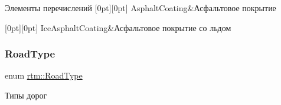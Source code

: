 \begin{DoxyEnumFields}{Элементы перечислений}
[0pt][0pt]{}\mbox{\label{namespacertm_aecd3929e64cd461eb3555b611f6fad95a1f8f9e610f75384989d155de714ce952}} 
Asphalt\+Coating&Асфальтовое покрытие \\
\hline

[0pt][0pt]{}\mbox{\label{namespacertm_aecd3929e64cd461eb3555b611f6fad95a8db92a56dc64708248e1cca508c21fec}} 
Ice\+Asphalt\+Coating&Асфальтовое покрытие со льдом \\
\hline

\end{DoxyEnumFields}
\mbox{\label{namespacertm_abde1dc022a0c505026f6f4da1340cb85}} 
\subsubsection{\texorpdfstring{Road\+Type}{RoadType}}
{\footnotesize\ttfamily enum \hyperlink{namespacertm_abde1dc022a0c505026f6f4da1340cb85}{rtm\+::\+Road\+Type}}



Типы дорог 


